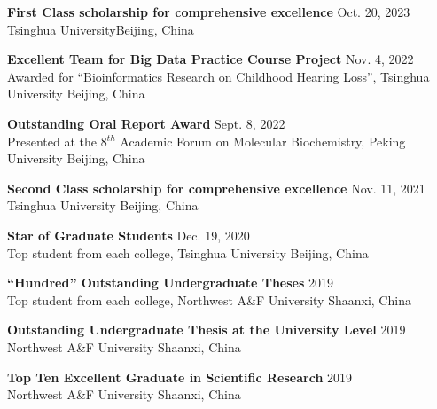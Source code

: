\textbf{First Class scholarship for comprehensive excellence} \hfill Oct. 20, 2023 \\
{\small Tsinghua University\hfill  Beijing, China}

\vspace{5pt}

\textbf{Excellent Team for Big Data Practice Course Project} \hfill Nov. 4, 2022 \\
{\small Awarded for ``Bioinformatics Research on Childhood Hearing Loss'', Tsinghua University \hfill Beijing, China}

\vspace{5pt}

\textbf{Outstanding Oral Report Award} \hfill Sept. 8, 2022 \\
{\small Presented at the 8$^{th}$ Academic Forum on Molecular Biochemistry, Peking University \hfill Beijing, China}

\vspace{5pt}

\textbf{Second Class scholarship for comprehensive excellence} \hfill Nov. 11, 2021 \\
{\small Tsinghua University \hfill Beijing, China}

\vspace{5pt}

\textbf{Star of Graduate Students} \hfill Dec. 19, 2020 \\
{\small Top student from each college, Tsinghua University \hfill Beijing, China}

\vspace{5pt}

\textbf{``Hundred'' Outstanding Undergraduate Theses} \hfill 2019 \\
{\small Top student from each college, Northwest A\&F University \hfill Shaanxi, China}

\vspace{5pt}

\textbf{Outstanding Undergraduate Thesis at the University Level} \hfill 2019 \\
{\small Northwest A\&F University \hfill Shaanxi, China}

\vspace{5pt}

\textbf{Top Ten Excellent Graduate in Scientific Research} \hfill 2019 \\
{\small Northwest A\&F University \hfill Shaanxi, China}

\vspace{5pt}

